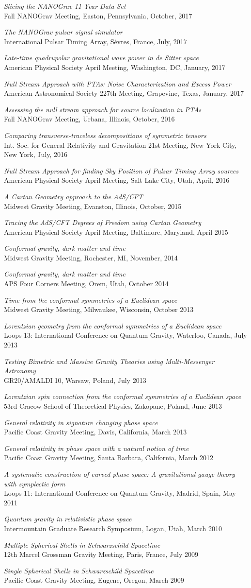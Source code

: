 \documentclass[11pt,letterpaper,sans,unicode]{moderncv}
\newcommand{\talkitem}[3]{\item \textit{#1}\\{#2}, #3} %
\begin{document}
\begin{etaremune}[leftmargin=8mm]
\talkitem{Slicing the NANOGrav 11 Year Data Set}{Fall NANOGrav Meeting} Easton, Pennsylvania, October, 2017
\talkitem{The NANOGrav pulsar signal simulator}{International Pulsar Timing Array}{S\`{e}vres, France, July, 2017}
\talkitem{Late-time quadrupolar gravitational wave power in de Sitter space}{American Physical Society April Meeting}{Washington, DC, January, 2017}
\talkitem{Null Stream Approach with PTAs: Noise Characterization and Excess Power}{American Astronomical Society 227th Meeting}{Grapevine, Texas, January, 2017}
\talkitem{Assessing the null stream approach for source localization in PTAs}{Fall NANOGrav Meeting}{Urbana, Illinois, October, 2016}
\talkitem{Comparing transverse-traceless decompositions of symmetric tensors}{Int. Soc. for General Relativity and Gravitation 21st Meeting}{New York City, New York, July, 2016}
\talkitem{Null Stream Approach for finding Sky Position of Pulsar Timing Array sources}{American Physical Society April Meeting}{Salt Lake City, Utah, April, 2016}
\talkitem{A Cartan Geometry approach to the AdS/CFT}{Midwest Gravity Meeting}{Evanston, Illinois, October, 2015}
\talkitem{Tracing the AdS/CFT Degrees of Freedom using Cartan Geometry}{American Physical Society April Meeting}{Baltimore, Maryland, April 2015}
\talkitem{Conformal gravity, dark matter and time}{Midwest Gravity Meeting}{Rochester, MI, November, 2014}
\talkitem{Conformal gravity, dark matter and time}{APS Four Corners Meeting}{Orem, Utah, October 2014}
\talkitem{Time from the conformal symmetries of a Euclidean space}{Midwest Gravity Meeting} Milwaukee, Wisconsin, October 2013
\talkitem{Lorentzian geometry from the conformal symmetries of a Euclidean space}{Loops 13: International Conference on Quantum Gravity}{Waterloo, Canada, July 2013}
\talkitem{Testing Bimetric and Massive Gravity Theories using Multi-Messenger Astronomy}{GR20/AMALDI$\;$10}{Warsaw, Poland, July 2013}
\talkitem{Lorentzian spin connection from the conformal symmetries of a Euclidean space}{53rd Cracow School of Theoretical Physics}{Zakopane, Poland, June 2013}
\talkitem{General relativity in signature changing phase space}{Pacific Coast Gravity Meeting}{Davis, California, March 2013}
\talkitem{General relativity in phase space with a natural notion of time}{Pacific Coast Gravity Meeting}{Santa Barbara, California, March 2012}
\talkitem{A systematic construction of curved phase space: A gravitational gauge theory with symplectic form}{Loops 11: International Conference on Quantum Gravity}{Madrid, Spain, May 2011}
\talkitem{Quantum gravity in relativistic phase space}{Intermountain Graduate Research Symposium}{Logan, Utah, March 2010}
\talkitem{Multiple Spherical Shells in Schwarzschild Spacetime}{12th Marcel Grossman Gravity Meeting}{Paris, France, July 2009}
\talkitem{Single Spherical Shells in Schwarzschild Spacetime}{Pacific Coast Gravity Meeting}{Eugene, Oregon, March 2009}


\end{etaremune}
\end{document}

